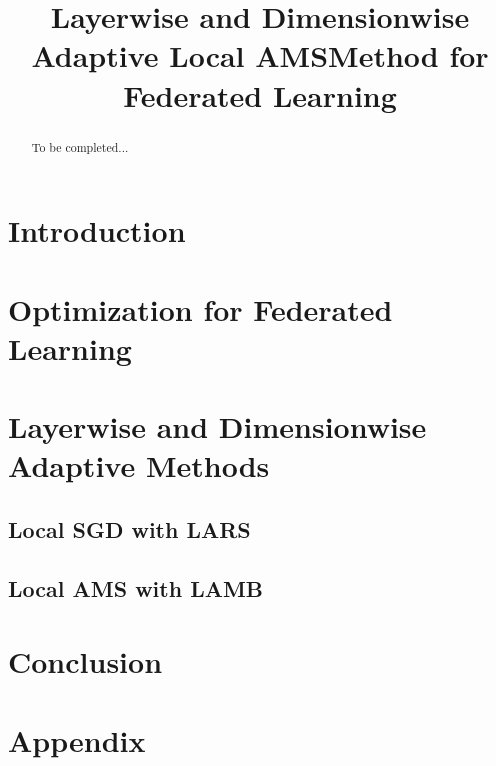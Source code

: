 \documentclass{article}
\begin{document}
\title{Layerwise and Dimensionwise Adaptive Local AMSMethod for Federated Learning}


\date{}
\maketitle

\begin{abstract}
To be completed...
\end{abstract}

\section{Introduction}\label{sec:introduction}

\section{Optimization for Federated Learning}\label{sec:preliminaries}


\section{Layerwise and Dimensionwise Adaptive Methods}\label{sec:main}

\subsection{Local SGD with LARS}

\subsection{Local AMS with LAMB}


\section{Conclusion}\label{sec:conclusion}

\newpage





\appendix 

\section{Appendix}\label{sec:appendix}


\end{document}
